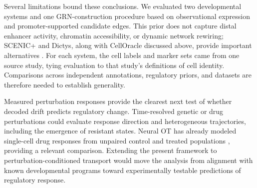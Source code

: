 \documentclass[
  11pt,
  letterpaper,
]{article}
\begin{document}
Several limitations bound these conclusions. We evaluated two
developmental systems and one GRN-construction procedure based on
observational expression and promoter-supported candidate edges. This
prior does not capture distal enhancer activity, chromatin accessibility,
or dynamic network rewiring; SCENIC+ and Dictys, along with CellOracle
discussed above, provide important alternatives
\parencite{bravo_gonzalez-blas_scenic_2023,wang_dictys_2023,kamimoto_dissecting_2023}. For each system, the cell
labels and marker sets came from one source study, tying evaluation to
that study's definitions of cell identity. Comparisons across independent annotations, regulatory
priors, and datasets are therefore needed to establish generality.

Measured perturbation responses provide the clearest next test of whether
decoded drift predicts regulatory change. Time-resolved genetic or drug
perturbations could evaluate response direction and heterogeneous
trajectories, including the emergence of resistant states. Neural OT has
already modeled single-cell drug responses from unpaired control and
treated populations \parencite{bunne_learning_2023}, providing a relevant
comparison. Extending the present framework to perturbation-conditioned
transport would move the analysis from alignment with known
developmental programs toward experimentally testable predictions of
regulatory response.

\printbibliography[heading=bibintoc,title={References}]
\end{document}
